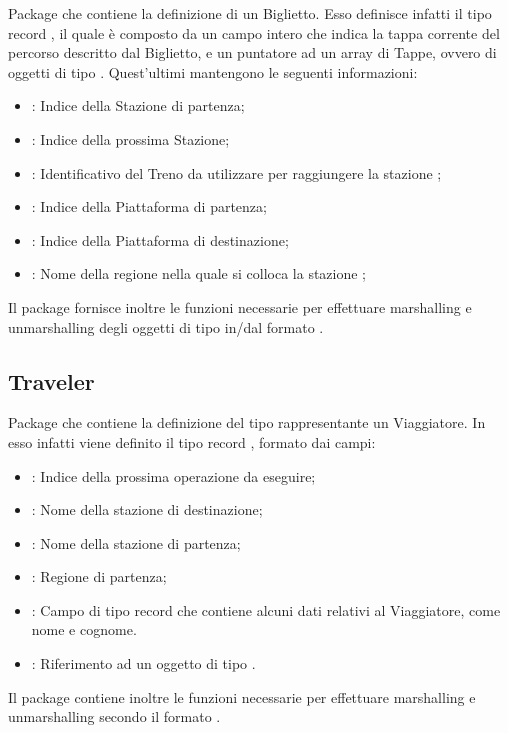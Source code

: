 	Package che contiene la definizione di un Biglietto. Esso definisce infatti il tipo record , il quale è composto da un campo intero  che indica la tappa corrente del percorso descritto dal Biglietto, e un puntatore ad un array di Tappe, ovvero di oggetti di tipo . Quest'ultimi mantengono le seguenti informazioni:
		\begin{itemize}
			\item {} : Indice della Stazione di partenza;
			\item {} : Indice della prossima Stazione;
			\item {} : Identificativo del Treno da utilizzare per raggiungere la stazione ;
			\item {} : Indice della Piattaforma di partenza;
			\item {} : Indice della Piattaforma di destinazione;
			\item {} : Nome della regione nella quale si colloca la stazione ;
		\end{itemize}
	Il package fornisce inoltre le funzioni necessarie per effettuare marshalling e unmarshalling degli oggetti di tipo  in/dal formato .
	
	\subsection{Traveler}
	
	Package che contiene la definizione del tipo rappresentante un Viaggiatore. In esso infatti viene definito il tipo record , formato dai campi:
		\begin{itemize}
			\item {} : Indice della prossima operazione da eseguire;
			\item {} : Nome della stazione di destinazione;
			\item {} : Nome della stazione di partenza;
			\item {} : Regione di partenza;
			\item {} : Campo di tipo record che contiene alcuni dati relativi al Viaggiatore, come nome e cognome.
			\item {} : Riferimento ad un oggetto di tipo .
		\end{itemize}
	Il package  contiene inoltre le funzioni necessarie per effettuare marshalling e unmarshalling secondo il formato .
	

